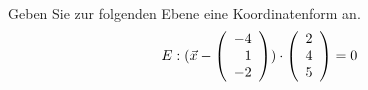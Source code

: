 \begin{aufgabe} ~ \\ 
Geben Sie zur folgenden Ebene eine Koordinatenform an.\[E: (\vec{x} - \Vekd{-4}{1}{-2}) \cdot \Vekd{2}{4}{5} = 0 \]\end{aufgabe} 
